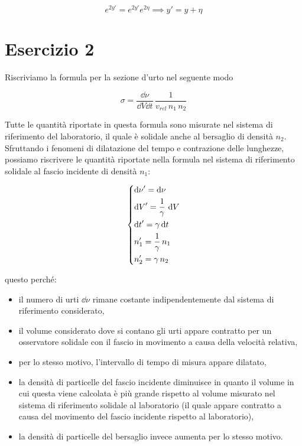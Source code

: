 \documentclass[12pt,notitlepage]{report}
\begin{document}
\begin{equation}
	e^{2 y'} = e^{2 y'} e^{2 \eta} %
	\implies %
	y'= y + \eta
\end{equation}


\section{Esercizio 2}

Riscriviamo la formula per la sezione d'urto nel seguente modo

\begin{equation}
	\sigma = \dfrac{\dd{\nu}}{\dd{V} \dd{t}} \, \dfrac{1}{v_{rel} \, n_{1} \, n_{2}}
\end{equation}

Tutte le quantità riportate in questa formula sono misurate nel sistema di riferimento del laboratorio, il quale è solidale anche al bersaglio di densità $n_{2}$. \\
Sfruttando i fenomeni di dilatazione del tempo e contrazione delle lunghezze, possiamo riscrivere le quantità riportate nella formula nel sistema di riferimento solidale al fascio incidente di densità $n_{1}$:

\begin{equation}
	\begin{dcases}
		\dd{\nu}' = \dd{\nu} \\
		\dd{V}' = \dfrac{1}{\gamma} \, \dd{V} \\
		\dd{t}' = \gamma \dd{t} \\
		n_{1}' = \dfrac{1}{\gamma} \, n_{1} \\
		n_{2}' = \gamma \, n_{2}
	\end{dcases}
\end{equation}

questo perché:

\begin{itemize}
	\item il numero di urti $\dd{\nu}$ rimane costante indipendentemente dal sistema di riferimento considerato,
	
	\item il volume considerato dove si contano gli urti appare contratto per un osservatore solidale con il fascio in movimento a causa della velocità relativa,
	
	\item per lo stesso motivo, l'intervallo di tempo di misura appare dilatato,
	
	\item la densità di particelle del fascio incidente diminuisce in quanto il volume in cui questa viene calcolata è più grande rispetto al volume misurato nel sistema di riferimento solidale al laboratorio (il quale appare contratto a causa del movimento del fascio incidente rispetto al laboratorio), 
	
	\item la densità di particelle del bersaglio invece aumenta per lo stesso motivo.
\end{itemize}
\end{document}
